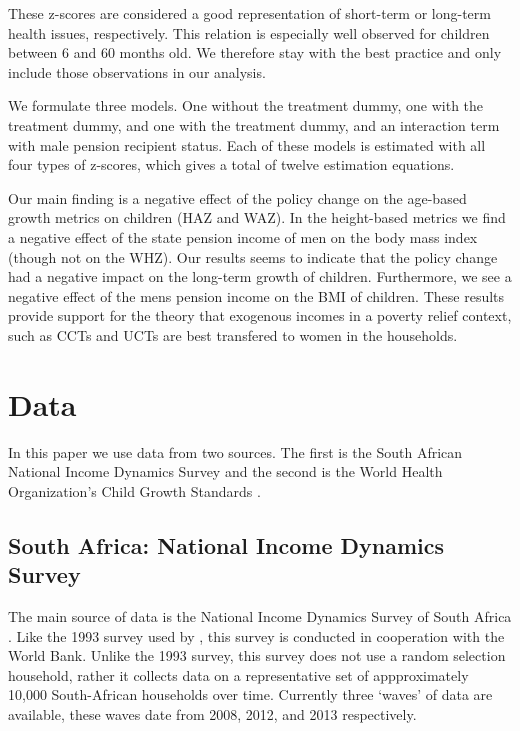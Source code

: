 \begin{refsection}
These z-scores are considered a good representation of short-term or long-term health issues, respectively.
This relation is especially well observed for children between 6 and 60 months old.
We therefore stay with the best practice and only include those observations in our analysis.

We formulate three models. One without the treatment dummy,
one with the treatment dummy, and one with the treatment dummy,
and an interaction term with male pension recipient status.
Each of these models is estimated with all four types of z-scores,
which gives a total of twelve estimation equations.




Our main finding is a negative effect of the policy change on the age-based growth metrics on children (HAZ and WAZ).
In the height-based metrics we find a negative effect of the state pension income of men on the body mass index (though not on the WHZ).
Our results seems to indicate that the policy change had a negative impact on the long-term growth of children.
Furthermore, we see a negative effect of the mens pension income on the BMI of children.
These results provide support for the theory that exogenous incomes in a poverty relief context,
such as CCTs and UCTs are best transfered to women in the households.

\section{Data}
\label{sa:data}
In this paper we use data from two sources.
The first is the South African National Income Dynamics Survey \parencite[NIDS][]{saldru2008nids, saldru2012nids, saldru2013nids} and the second is the World Health Organization's Child Growth Standards \parencite[WHO]{who2006child}.

\subsection{South Africa: National Income Dynamics Survey}
The main source of data is the National Income Dynamics Survey of South Africa \parencite{saldru2008nids, saldru2012nids, saldru2013nids}.
Like the 1993 survey used by \textcite{duflo2000child, duflo2003grandmothers}, this survey is conducted in cooperation with the World Bank.
Unlike the 1993 survey, this survey does not use a random selection household,
rather it collects data on a representative set of appproximately 10,000 South-African households over time.
Currently three `waves' of data are available, these waves date from 2008, 2012, and 2013 respectively.


\end{refsection}
